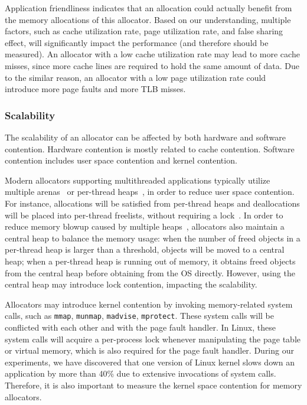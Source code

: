 Application friendliness indicates that an allocation could actually benefit from the memory allocations of this allocator. Based on our understanding, multiple factors, such as cache utilization rate, page utilization rate, and false sharing effect, will significantly impact the performance (and therefore should be measured). An allocator with a low cache utilization rate may lead to more cache misses, since more cache lines are required to hold the same amount of data. Due to the similar reason, an allocator with a low page utilization rate could introduce more page faults and more TLB misses. 

\subsubsection{Scalability} 
\label{sec:scalability}

The scalability of an allocator can be affected by both hardware and software contention. Hardware contention is mostly related to cache contention. Software contention includes user space contention and kernel contention. 

Modern allocators supporting multithreaded applications typically utilize multiple arenas~\citep{dlmalloc} or per-thread heaps~\citep{Hoard}, in order to reduce user space contention. For instance, allocations will be satisfied from per-thread heaps and deallocations will be placed into per-thread freelists, without requiring a lock~\citep{TcMalloc, jemalloc}. In order to reduce memory blowup caused by multiple heaps~\citep{Hoard}, allocators also maintain a central heap to balance the memory usage: when the number of freed objects in a per-thread heap is larger than a threshold, objects will be moved to a central heap; when a per-thread heap is running out of memory, it obtains freed objects from the central heap before obtaining from the OS directly. However, using the central heap may introduce lock contention, impacting the scalability.  

 
 Allocators may introduce kernel contention by invoking memory-related system calls, such as \texttt{mmap}, \texttt{munmap}, \texttt{madvise}, \texttt{mprotect}. These system calls will be conflicted with each other and with the page fault handler.  In Linux, these system calls will acquire a per-process lock whenever manipulating the page table or virtual memory, which is also required for the page fault handler. During our experiments, we have discovered that one version of Linux kernel slows down an application by more than 40\% due to extensive invocations of system calls. Therefore, it is also important to measure the kernel space contention for memory allocators.
 
